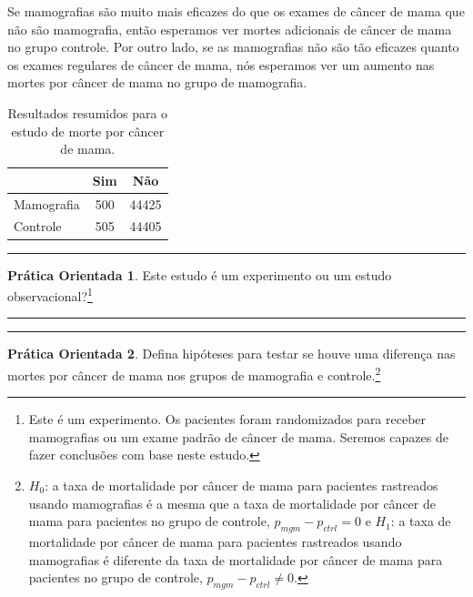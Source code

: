 \documentclass[
]{book}
\theoremstyle{definition}
\theoremstyle{definition}
\theoremstyle{definition}
\newtheorem{exercise}{Prática Orientada}[chapter]
\theoremstyle{definition}
\theoremstyle{remark}
\begin{document}
Se mamografias são muito mais eficazes do que os exames de câncer de mama que não são mamografia, então esperamos ver mortes adicionais de câncer de mama no grupo controle. Por outro lado, se as mamografias não são tão eficazes quanto os exames regulares de câncer de mama, nós esperamos ver um aumento nas mortes por câncer de mama no grupo de mamografia.

\begin{table}

\caption{\label{tab:mammogramStudySummaryTable}Resultados resumidos para o estudo de morte por câncer de mama.}
\centering
\begin{tabular}[t]{l|c|c}
\hline
  & Sim & Não\\
\hline
Mamografia & 500 & 44425\\
\hline
Controle & 505 & 44405\\
\hline
\end{tabular}
\end{table}

\begin{center}\rule{0.5\linewidth}{0.5pt}\end{center}

\begin{exercise}
\protect\hypertarget{exr:unnamed-chunk-232}{}{\label{exr:unnamed-chunk-232} }Este estudo é um experimento ou um estudo observacional?\footnote{Este é um experimento. Os pacientes foram randomizados para receber mamografias ou um exame padrão de câncer de mama. Seremos capazes de fazer conclusões com base neste estudo.}
\end{exercise}

\begin{center}\rule{0.5\linewidth}{0.5pt}\end{center}

\begin{center}\rule{0.5\linewidth}{0.5pt}\end{center}

\begin{exercise}
\protect\hypertarget{exr:htFormammogramStudySummaryTable}{}{\label{exr:htFormammogramStudySummaryTable} }Defina hipóteses para testar se houve uma diferença nas mortes por câncer de mama nos grupos de mamografia e controle.\footnote{\(H_0\): a taxa de mortalidade por câncer de mama para pacientes rastreados usando mamografias é a mesma que a taxa de mortalidade por câncer de mama para pacientes no grupo de controle, \(p_{mgm} - p_{ctrl} = 0\) e \(H_1\): a taxa de mortalidade por câncer de mama para pacientes rastreados usando mamografias é diferente da taxa de mortalidade por câncer de mama para pacientes no grupo de controle, \(p_{mgm} - p_{ctrl} \neq 0\).}
\end{exercise}
\end{document}
